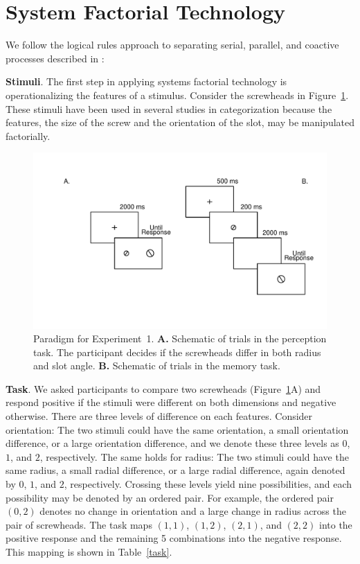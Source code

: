 \documentclass[fignum,nobf,man]{apa}
\begin{document}
\section{System Factorial Technology}
We follow the logical rules approach to separating serial, parallel, and coactive processes described in \citet{Fific:etal:2010}:


{\bf Stimuli}.  The first step in applying systems factorial technology is operationalizing the features of a stimulus.  Consider the screwheads in Figure~\ref{paradigm}.  These stimuli have been used in several studies
in categorization \citep[e.g.,][]{Maddox:Ashby:1993,McKinley:Nosofsky:1995}
because the features, the size of the screw and the orientation of the slot, may be manipulated factorially.


\begin{figure}
\centering
\includegraphics[width=6in]{experimentFrames.pdf}
\caption{Paradigm for Experiment~1.  {\bf A.} Schematic of trials in the perception task.  The participant decides if the screwheads differ in both radius and slot angle.  {\bf B.}  Schematic of trials in the memory task.}
\label{paradigm}
\end{figure}


{\bf Task}.  We asked participants to compare two screwheads (Figure~\ref{paradigm}A) and respond positive if the stimuli were different on both dimensions and negative otherwise.  There are three levels of difference on each features.  Consider orientation:  The two stimuli could have the same orientation, a small orientation difference, or a large orientation difference, and we denote these three levels as $0$, $1$, and $2$, respectively.  The same holds for radius: The two stimuli could have the same radius, a small radial difference, or a large radial difference, again denoted by $0$, $1$, and $2$, respectively.  Crossing these levels yield nine possibilities, and each possibility may be denoted by an ordered pair.   For example, the ordered pair $(0,2)$ denotes no change in orientation and a large change in radius across the pair of screwheads.  The task maps $(1,1)$, $(1,2)$, $(2,1)$, and $(2,2)$ into the positive response and the remaining 5 combinations into the negative response.  This mapping is shown in Table~\ref{task}.
\end{document}
